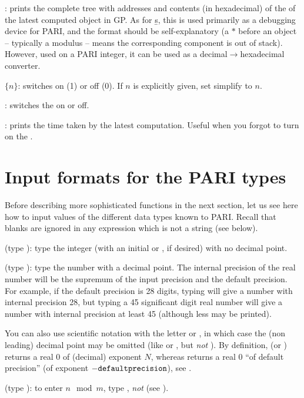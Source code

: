 : prints the complete tree with addresses and contents (in
hexadecimal) of the  of the latest computed
object in GP. As for \b{s}, this is used primarily as a debugging device for
PARI, and the format should be self-explanatory (a $*$ before an object --
typically a modulus -- means the corresponding component is out of stack).
However, used on a PARI integer, it can be used as a
decimal$\rightarrow$hexadecimal converter.

 $\{n\}$: switches  on (1) or off (0). If $n$
is explicitly given, set simplify to $n$.

\subseckbd{\#}: switches the  on or off.

\subseckbd{\#\#}: prints the time taken by the latest computation.
Useful when you forgot to turn on the .

\section{Input formats for the PARI types}

\noindent
Before describing more sophisticated functions in the next section, let us
see here how to input values of the different data types known to PARI.
Recall that blanks are ignored in any expression which is not a string (see
below).

 
(type ): type the integer (with an initial
\kbd{+} or \kbd{-}, if desired) with no decimal point.

 
(type ): type the number with a decimal
point. The internal precision of the real number will be the supremum of the
input precision and the default precision. For example, if the default
precision is 28 digits, typing  will give a number with internal
precision 28, but typing a 45 significant digit real number will give a
number with internal precision at least 45 (although less may be printed).

You can also use scientific notation with the letter  or
, in which case the (non leading) decimal point may be omitted (like
 or , but \emph{not} ). By definition,
 (or ) returns a real $0$ of (decimal) exponent
$N$, whereas  returns a real 0 ``of default precision'' (of exponent
$-{\tt defaultprecision}$), see .

(type ): to enter $n \mod m$, type
, \emph{not}  (see ).

